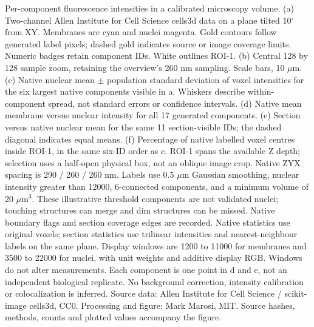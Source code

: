 \caption{Per-component fluorescence intensities in a calibrated microscopy volume.
(a) Two-channel Allen Institute for Cell Science cells3d data on a plane tilted 10\(^{\circ}\) from XY.
Membranes are cyan and nuclei magenta. Gold contours follow generated label pixels;
dashed gold indicates source or image coverage limits. Numeric badges retain component IDs.
White outlines ROI-1. (b) Central 128 by 128 sample zoom, retaining the overview's 260 nm sampling.
Scale bars, 10 \(\mu\mathrm{m}\). (c) Native nuclear mean \(\pm\) population standard deviation of voxel intensities
for the six largest native components visible in a. Whiskers describe within-component
spread, not standard errors or confidence intervals. (d) Native mean membrane versus nuclear
intensity for all 17 generated components. (e) Section versus native nuclear mean for the
same 11 section-visible IDs; the dashed diagonal indicates equal means. (f) Percentage of
native labelled voxel centres inside ROI-1, in the same six-ID order as c. ROI-1 spans the
available Z depth; selection uses a half-open physical box, not an oblique image crop.
Native ZYX spacing is 290 / 260 / 260 nm. Labels use 0.5 \(\mu\mathrm{m}\) Gaussian smoothing, nuclear
intensity greater than 12000, 6-connected components, and a minimum volume of 20 \(\mu\mathrm{m}^3\).
These illustrative threshold components are not validated nuclei; touching structures can
merge and dim structures can be missed. Native boundary flags and section coverage edges
are recorded. Native statistics use original voxels; section statistics use trilinear
intensities and nearest-neighbour labels on the same plane. Display windows are 1200 to
11000 for membranes and 3500 to 22000 for nuclei, with unit weights and additive display RGB.
Windows do not alter measurements. Each component is one point in d and e, not an independent
biological replicate. No background correction, intensity calibration or colocalization is
inferred. Source data: Allen Institute for Cell Science / scikit-image cells3d, CC0.
Processing and figure: Mark Marosi, MIT. Source hashes, methods, counts and plotted values
accompany the figure.}
